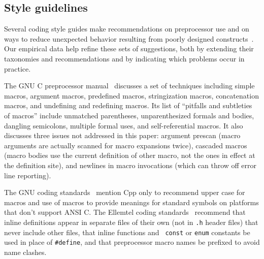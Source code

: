 \documentclass[10pt]{article}
\newcommand{\file}[1]{\texttt{#1}}
\begin{document}
\subsection{Style guidelines}

Several coding style guides make recommendations on preprocessor use and on
ways to reduce unexpected behavior resulting from poorly designed
constructs~\cite{Cannon90}.  Our empirical data help refine these sets of
suggestions, both by extending their taxonomies and recommendations and by
indicating which problems occur in practice.

The GNU C preprocessor manual~\cite{cpp-manual} discusses
a set of techniques including simple macros, argument macros, predefined
macros, stringization macros, concatenation macros, and undefining and
redefining macros.  Its list of ``pitfalls and subtleties of macros'' include
unmatched parentheses, unparenthesized formals and bodies, dangling
semicolons, multiple formal uses, and self-referential macros.  It also
discusses three issues not addressed in this paper:  argument prescan
(macro arguments are actually scanned for macro expansions twice), cascaded
macros (macro bodies use the current definition of other macro, not the
ones in effect at the definition site), and newlines in macro invocations
(which can throw off error line reporting).

The GNU coding standards~\cite{Stallman97} mention Cpp only to recommend
upper case for macros and use of macros to provide meanings for standard
symbols on platforms that don't support ANSI C\@.
The Ellemtel coding standards~\cite{ellemtel92} recommend that inline
definitions appear in separate files of their own (not in \file{.h} header
files) that never include other files, that inline functions and {\tt
const} or {\tt enum} constants be used in place of {\tt \#define}, and that
preprocessor macro names be prefixed to avoid name clashes.
\end{document}
